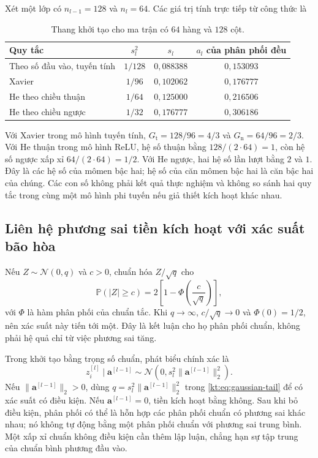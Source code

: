 Xét một lớp có $n_{l-1}=128$ và $n_l=64$. Các giá trị tính trực
tiếp từ công thức là
\begin{table}[htbp]
\centering\small
\caption{Thang khởi tạo cho ma trận có $64$ hàng và $128$ cột.}
\label{kt:tab:initialization}
\begin{tabular}{@{}lccc@{}}
\toprule
Quy tắc&$s_l^2$&$s_l$&$a_l$ của phân phối đều\\
\midrule
Theo số đầu vào, tuyến tính&$1/128$&$0{,}088388$&$0{,}153093$\\
Xavier&$1/96$&$0{,}102062$&$0{,}176777$\\
He theo chiều thuận&$1/64$&$0{,}125000$&$0{,}216506$\\
He theo chiều ngược&$1/32$&$0{,}176777$&$0{,}306186$\\
\bottomrule
\end{tabular}
\end{table}
Với Xavier trong mô hình tuyến tính,
$G_{\mathrm t}=128/96=4/3$ và $G_{\mathrm n}=64/96=2/3$.
Với He thuận trong mô hình ReLU, hệ số thuận bằng
$128/(2\cdot64)=1$, còn hệ số ngược xấp xỉ
$64/(2\cdot64)=1/2$. Với He ngược, hai hệ số lần lượt bằng $2$
và $1$. Đây là các hệ số của mômen bậc hai; hệ số của căn mômen
bậc hai là căn bậc hai của chúng. Các con số không phải kết quả
thực nghiệm và không so sánh hai quy tắc trong cùng một mô hình
phi tuyến nếu giả thiết kích hoạt khác nhau.

\subsection{Liên hệ phương sai tiền kích hoạt với xác suất bão hòa}

Nếu $Z\sim\mathcal N(0,q)$ và $c>0$, chuẩn hóa $Z/\sqrt q$ cho
\begin{equation}
 \mathbb P(|Z|\geq c)
 =2\left[1-\Phi\left(\frac c{\sqrt q}\right)\right],
 \label{kt:eq:gaussian-tail}
\end{equation}
với $\Phi$ là hàm phân phối của chuẩn tắc. Khi $q\to\infty$,
$c/\sqrt q\to0$ và $\Phi(0)=1/2$, nên xác suất này tiến tới một.
Đây là kết luận cho họ phân phối chuẩn, không phải hệ quả chỉ từ
việc phương sai tăng.

Trong khởi tạo bằng trọng số chuẩn, phát biểu chính xác là
\begin{equation}
 z_i^{[l]}\mid\mathbf a^{[l-1]}
 \sim\mathcal N\left(0,s_l^2\|\mathbf a^{[l-1]}\|_2^2\right).
 \label{kt:eq:conditional-normal}
\end{equation}
Nếu $\|\mathbf a^{[l-1]}\|_2>0$, dùng
$q=s_l^2\|\mathbf a^{[l-1]}\|_2^2$ trong
\eqref{kt:eq:gaussian-tail} để có xác suất có điều kiện. Nếu
$\mathbf a^{[l-1]}=0$, tiền kích hoạt bằng không. Sau khi bỏ điều
kiện, phân phối có thể là hỗn hợp các phân phối chuẩn có phương
sai khác nhau; nó không tự động bằng một phân phối chuẩn với
phương sai trung bình. Một xấp xỉ chuẩn không điều kiện cần thêm
lập luận, chẳng hạn sự tập trung của chuẩn bình phương đầu vào.

